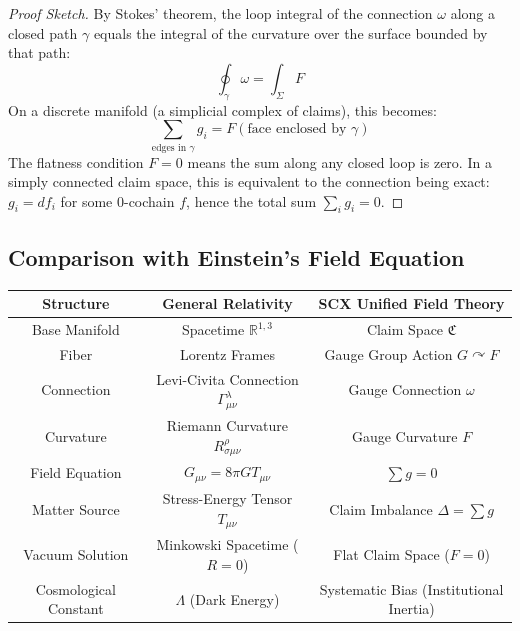 \documentclass[12pt,a4paper]{article}
\theoremstyle{plain}
\theoremstyle{definition}
\newcommand{\R}{\mathbb{R}}
\newcommand{\curv}{F}
\newcommand{\conn}{\omega}
\newcommand{\ClaimSpace}{\mathfrak{C}}
\begin{document}
\begin{proof}[Proof Sketch]
By Stokes' theorem, the loop integral of the connection $\conn$ along a closed path $\gamma$ equals the integral of the curvature over the surface bounded by that path:
\begin{equation}
    \oint_\gamma \conn = \int_\Sigma \curv
\end{equation}
On a discrete manifold (a simplicial complex of claims), this becomes:
\begin{equation}
    \sum_{\text{edges in } \gamma} g_i = F(\text{face enclosed by } \gamma)
\end{equation}
The flatness condition $\curv = 0$ means the sum along any closed loop is zero. In a simply connected claim space, this is equivalent to the connection being exact: $g_i = df_i$ for some 0-cochain $f$, hence the total sum $\sum_i g_i = 0$.
\end{proof}

\subsection{Comparison with Einstein's Field Equation}

\begin{center}
\begin{tabular}{c|c|c}
    \toprule
    \textbf{Structure} & \textbf{General Relativity} & \textbf{SCX Unified Field Theory} \\
    \midrule
    Base Manifold & Spacetime $\R^{1,3}$ & Claim Space $\ClaimSpace$ \\
    Fiber & Lorentz Frames & Gauge Group Action $G \curvearrowright F$ \\
    Connection & Levi-Civita Connection $\Gamma^\lambda_{\mu\nu}$ & Gauge Connection $\conn$ \\
    Curvature & Riemann Curvature $R^\rho_{\sigma\mu\nu}$ & Gauge Curvature $\curv$ \\
    Field Equation & $G_{\mu\nu} = 8\pi G T_{\mu\nu}$ & $\sum g = 0$ \\
    Matter Source & Stress-Energy Tensor $T_{\mu\nu}$ & Claim Imbalance $\Delta = \sum g$ \\
    Vacuum Solution & Minkowski Spacetime ($R=0$) & Flat Claim Space ($\curv=0$) \\
    Cosmological Constant & $\Lambda$ (Dark Energy) & Systematic Bias (Institutional Inertia) \\
    \bottomrule
\end{tabular}
\end{center}
\end{document}
